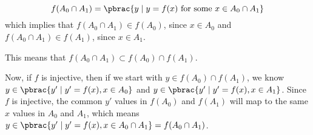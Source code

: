{{    \item
    \begin{equation*}
      f(A_0 \cap A_1) = \pbrac{y \mid y = f(x) \text{ for some } x \in A_0 \cap A_1}
    \end{equation*}
    which implies that $f(A_0 \cap A_1) \in f(A_0)$, since $x \in A_0$ and $f(A_0 \cap A_1) \in f(A_1)$, since $x \in A_1$.

    This means that $f(A_0 \cap A_1) \subset f(A_0) \cap f(A_1)$.

    Now, if $f$ is injective, then if we start with $y \in f(A_0) \cap f(A_1)$,
    we know $y \in \pbrac{y' \mid y' = f(x), x \in A_0}$ and
    $y \in \pbrac{y' \mid y' = f(x), x \in A_1}$. Since $f$ is injective, the
    common $y'$ values in $f(A_0)$ and $f(A_1)$ will map to the same $x$ values
    in $A_0$ and $A_1$, which means $y \in \pbrac{y' \mid y' = f(x), x \in A_0 \cap A_1} = f(A_0 \cap A_1)$.
  }
}


\bx{
  \ea{
    \item
  }
}
